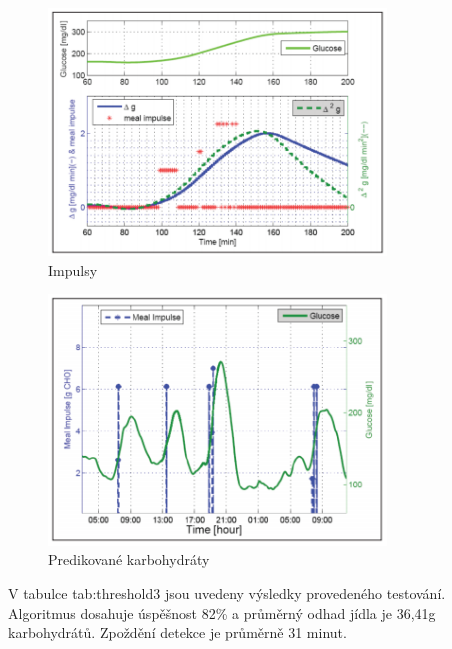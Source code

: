 \begin{figure}[H]
\caption{Impulsy}
\label{fig:threshold1}
\centering
\includegraphics[width=0.8\textwidth]{img/analyza/threshold1.png}
\end{figure}
\begin{figure}[H]
\caption{Predikované karbohydráty}
\label{fig:threshold2}
\centering
\includegraphics[width=0.8\textwidth]{img/analyza/threshold2.png}
\end{figure}

V tabulce {tab:threshold3} jsou uvedeny výsledky provedeného testování. Algoritmus dosahuje úspěšnost 82\% a průměrný odhad jídla je 36,41g karbohydrátů. Zpoždění detekce je průměrně 31 minut.

